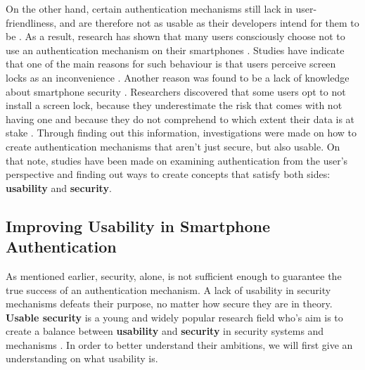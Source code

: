 On the other hand, certain authentication mechanisms still lack in user-friendliness, and are therefore not as usable as their developers intend for them to be \cite{Schloeglhofer}. As a result, research has shown that many users consciously choose not to use an authentication mechanism on their smartphones \cite{ediss20251, Albayram:2017:BUL:3235924.3235929, Egelman:2014:YRL:2660267.2660273}. Studies have indicate that one of the main reasons for such behaviour is that users perceive screen locks as an inconvenience \cite{Albayram:2017:BUL:3235924.3235929, ediss20251, harbach}. Another reason was found to be a lack of knowledge about smartphone security \cite{Albayram:2017:BUL:3235924.3235929, Adams:1999:UE:322796.322806}. Researchers discovered that some users opt to not install a screen lock, because they underestimate the risk that comes with not having one and because they do not comprehend to which extent their data is at stake \cite{Egelman:2014:YRL:2660267.2660273}. Through finding out this information, investigations were made on how to create authentication mechanisms that aren't just secure, but also usable. On that note, studies have been made on examining authentication from the user's perspective and finding out ways to create concepts that satisfy both sides: \textbf{usability} and \textbf{security}. 


\subsection{Improving Usability in Smartphone Authentication}

As mentioned earlier, security, alone, is not sufficient enough to guarantee the true success of an authentication mechanism. A lack of usability in security mechanisms defeats their purpose, no matter how secure they are in theory. \textbf{Usable security} is a young and widely popular research field who's aim is to create a balance between \textbf{usability} and \textbf{security} in security systems and mechanisms \cite{Realpe-Munoz, anonymous}. In order to better understand their ambitions, we will first give an understanding on what usability is. \\

